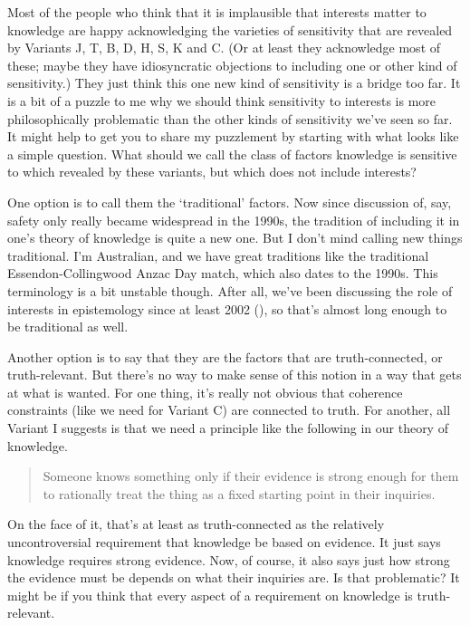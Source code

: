 \documentclass[
  10pt,
  letterpaper,
  twoside]{scrbook}
\begin{document}
Most of the people who think that it is implausible that interests
matter to knowledge are happy acknowledging the varieties of sensitivity
that are revealed by Variants J, T, B, D, H, S, K and C. (Or at least
they acknowledge most of these; maybe they have idiosyncratic objections
to including one or other kind of sensitivity.) They just think this one
new kind of sensitivity is a bridge too far. It is a bit of a puzzle to
me why we should think sensitivity to interests is more philosophically
problematic than the other kinds of sensitivity we've seen so far. It
might help to get you to share my puzzlement by starting with what looks
like a simple question. What should we call the class of factors
knowledge is sensitive to which revealed by these variants, but which
does not include interests?

One option is to call them the `traditional' factors. Now since
discussion of, say, safety only really became widespread in the 1990s,
the tradition of including it in one's theory of knowledge is quite a
new one. But I don't mind calling new things traditional. I'm
Australian, and we have great traditions like the traditional
Essendon-Collingwood Anzac Day match, which also dates to the 1990s.
This terminology is a bit unstable though. After all, we've been
discussing the role of interests in epistemology since at least 2002
(), so that's
almost long enough to be traditional as well.

Another option is to say that they are the factors that are
truth-connected, or truth-relevant. But there's no way to make sense of
this notion in a way that gets at what is wanted. For one thing, it's
really not obvious that coherence constraints (like we need for Variant
C) are connected to truth. For another, all Variant I suggests is that
we need a principle like the following in our theory of knowledge.

\begin{quote}
Someone knows something only if their evidence is strong enough for them
to rationally treat the thing as a fixed starting point in their
inquiries.
\end{quote}

On the face of it, that's at least as truth-connected as the relatively
uncontroversial requirement that knowledge be based on evidence. It just
says knowledge requires strong evidence. Now, of course, it also says
just how strong the evidence must be depends on what their inquiries
are. Is that problematic? It might be if you think that every aspect of
a requirement on knowledge is truth-relevant.
\end{document}
